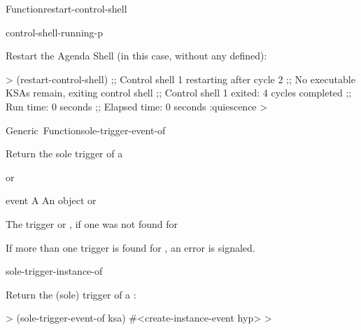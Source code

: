 \documentclass[10pt,twoside,english,pdftex]{article}
\begin{document}
\begin{functiondoc}{Function}{restart-control-shell}{%
     
    \returns{} \superstar}
\begin{alsos}{control-shell-running-p}
\end{alsos}

\fnexample
Restart the Agenda Shell (in this case, without any  defined):
%
\W\supp
\begin{example}
  > (restart-control-shell)
  ;; Control shell 1 restarting after cycle 2
  ;; No executable KSAs remain, exiting control shell
  ;; Control shell 1 exited: 4 cycles completed
  ;; Run time: 0 seconds
  ;; Elapsed time: 0 seconds
  :quiescence
  >
\end{example}

%
\fnnote \pollingnote

\end{functiondoc}


\begin{functiondoc}{Generic~Function}{sole-trigger-event-of}{ 
    \returns{} }
%
%
%

\fnsyntax

\fnpurpose Return the sole trigger  of a 

\fnmethods
{}%
  {\code{(} 
  \returns{}  or \nil}

\fnpackage {}

\fnmodule {}

\fnargs
\begin{args}{event}
\arg[ksa] A 
\arg[event] An  object or \nil{}
\end{args}

\fnreturns The trigger  or \nil, if one was not found for
  
\fndescription If more than one trigger  is found for
, an error is signaled.

\begin{alsos}{sole-trigger-instance-of}
\end{alsos}

\fnexample
Return the (sole) trigger  of a :
%
\W\supp
\begin{example}
  > (sole-trigger-event-of ksa)
  #<create-instance-event hyp>
  >
\end{example}

\end{functiondoc}
\end{document}
